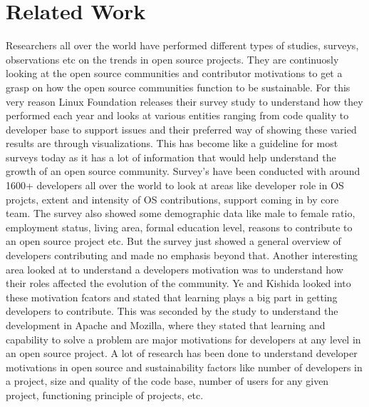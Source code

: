 \documentclass[seploa]{beavtex}
\begin{document}
\chapter{Related Work}
Researchers all over the world have performed different types of studies, surveys, observations etc on the trends in open source projects. They are continuosly looking at the open source communities and contributor motivations to get a grasp on how the open source communities function to be sustainable. For this very reason Linux Foundation releases their survey study to understand how they performed each year and looks at various entities ranging from code quality to developer base to support issues and their preferred way of showing these varied results are through visualizations\cite{lfs}. This has become like a guideline for most surveys today as it has a lot of information that would help understand the growth of an open source community. Survey's have been conducted with around 1600+ developers all over the world to look at areas like developer role in OS projcts, extent and intensity of OS contributions, support coming in by core team. The survey also showed some demographic data like male to female ratio, employment status, living area, formal education level, reasons to contribute to an open source project etc\cite{david2003}. But the survey just showed a general overview of developers contributing and made no emphasis beyond that. Another interesting area looked at to understand a developers motivation was to understand how their roles affected the evolution of the community. Ye and Kishida looked into these motivation fcators and stated that learning plays a big part in getting developers to contribute\cite{kishida2003}. This was seconded by the study to understand the development in Apache and Mozilla, where they stated that learning and capability to solve a problem are major motivations for developers at any level in an open source project\cite{mockus2002}. A lot of research has been done to understand developer motivations in open source and sustainability factors like number of developers in a project\cite{david2003, rishab2002}, size and quality of the code base\cite{marc2014}, number of users for any given project\cite{rishab2002}, functioning principle of projects\cite{tarja2013}, etc.
\end{document}
